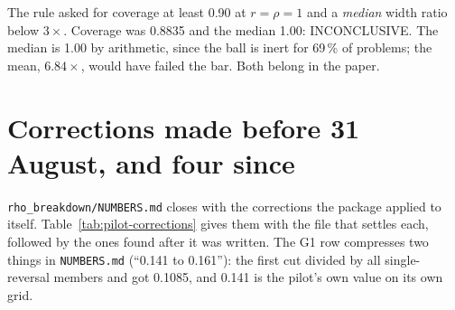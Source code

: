 \begin{armadilha}
The rule asked for coverage at least 0.90 at $r = \rho = 1$ and a \emph{median} width ratio below
$3\times$. Coverage was 0.8835 and the median 1.00: INCONCLUSIVE. The median is 1.00 by arithmetic,
since the ball is inert for 69\,\% of problems; the mean, $6.84\times$, would have failed the bar.
Both belong in the paper.
\end{armadilha}


\begin{antes}
\end{antes}

\section{Corrections made before 31 August, and four since}

\texttt{rho\_breakdown/NUMBERS.md} closes with the corrections the package applied to itself.
Table~\ref{tab:pilot-corrections} gives them with the file that settles each, followed by the ones
found after it was written. The G1 row compresses two things in \texttt{NUMBERS.md} (``0.141 to
0.161''): the first cut divided by all single-reversal members and got 0.1085, and 0.141 is the
pilot's own value on its own grid.

